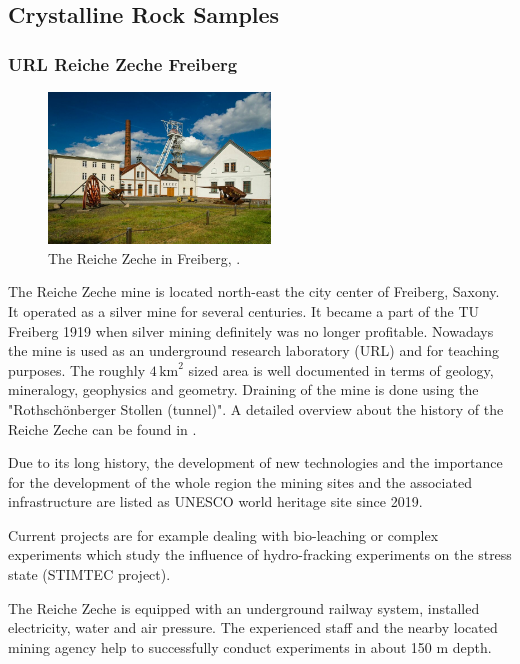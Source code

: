 \subsection{Crystalline Rock Samples}
\label{subsec:crystalline}

\subsubsection{URL Reiche Zeche Freiberg}

\begin{figure}
\centering
\includegraphics[width=5.9cm]{figures/reiche-zeche.jpg}
\caption{The Reiche Zeche in Freiberg, \cite{ReicheZechePicture}.}
\end{figure}
The Reiche Zeche mine is located north-east the city center of Freiberg, Saxony. It operated as a silver mine for several centuries. It became a part of the TU Freiberg 1919 when silver mining definitely was no longer profitable. Nowadays the mine is used as an underground research laboratory (URL) and for teaching purposes. The roughly $4\,\text{km}^2$ sized area is well documented in terms of geology, mineralogy, geophysics and geometry. Draining of the mine is done using the "Rothsch\"onberger Stollen (tunnel)". A detailed overview about the history of the Reiche Zeche can be found in \cite{ReicheZecheHistory}.

Due to its long history, the development of new technologies and the importance for the development of the whole region the mining sites and the associated infrastructure are listed as UNESCO world heritage site since 2019.

Current projects are for example dealing with bio-leaching or complex experiments which study the influence of hydro-fracking experiments on the stress state (STIMTEC project).

The Reiche Zeche is equipped with an underground railway system, installed electricity, water and air pressure. The experienced staff and the nearby located mining agency help to successfully conduct experiments in about 150 m depth. 

